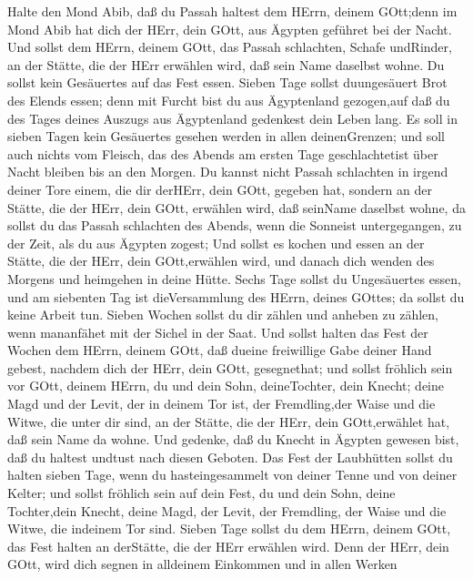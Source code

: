  Halte den Mond Abib, daß du Passah haltest dem HErrn,
deinem GOtt;denn im Mond Abib hat dich der HErr, dein GOtt, aus Ägypten
geführet bei der Nacht.  Und sollst dem HErrn, deinem GOtt,
das Passah schlachten, Schafe undRinder, an der Stätte, die der HErr
erwählen wird, daß sein Name daselbst wohne.  Du sollst kein
Gesäuertes auf das Fest essen. Sieben Tage sollst duungesäuert Brot des
Elends essen; denn mit Furcht bist du aus Ägyptenland gezogen,auf daß du
des Tages deines Auszugs aus Ägyptenland gedenkest dein Leben lang.
 Es soll in sieben Tagen kein Gesäuertes gesehen werden in
allen deinenGrenzen; und soll auch nichts vom Fleisch, das des Abends am
ersten Tage geschlachtetist über Nacht bleiben bis an den Morgen.
 Du kannst nicht Passah schlachten in irgend deiner Tore
einem, die dir derHErr, dein GOtt, gegeben hat,  sondern an
der Stätte, die der HErr, dein GOtt, erwählen wird, daß seinName
daselbst wohne, da sollst du das Passah schlachten des Abends, wenn die
Sonneist untergegangen, zu der Zeit, als du aus Ägypten zogest;
 Und sollst es kochen und essen an der Stätte, die der HErr,
dein GOtt,erwählen wird, und danach dich wenden des Morgens und
heimgehen in deine Hütte.  Sechs Tage sollst du Ungesäuertes
essen, und am siebenten Tag ist dieVersammlung des HErrn, deines GOttes;
da sollst du keine Arbeit tun.  Sieben Wochen sollst du dir
zählen und anheben zu zählen, wenn mananfähet mit der Sichel in der
Saat.  Und sollst halten das Fest der Wochen dem HErrn,
deinem GOtt, daß dueine freiwillige Gabe deiner Hand gebest, nachdem
dich der HErr, dein GOtt, gesegnethat;  und sollst fröhlich
sein vor GOtt, deinem HErrn, du und dein Sohn, deineTochter, dein
Knecht; deine Magd und der Levit, der in deinem Tor ist, der
Fremdling,der Waise und die Witwe, die unter dir sind, an der Stätte,
die der HErr, dein GOtt,erwählet hat, daß sein Name da wohne.
 Und gedenke, daß du Knecht in Ägypten gewesen bist, daß du
haltest undtust nach diesen Geboten.  Das Fest der
Laubhütten sollst du halten sieben Tage, wenn du hasteingesammelt von
deiner Tenne und von deiner Kelter;  und sollst fröhlich
sein auf dein Fest, du und dein Sohn, deine Tochter,dein Knecht, deine
Magd, der Levit, der Fremdling, der Waise und die Witwe, die indeinem
Tor sind.  Sieben Tage sollst du dem HErrn, deinem GOtt,
das Fest halten an derStätte, die der HErr erwählen wird. Denn der HErr,
dein GOtt, wird dich segnen in alldeinem Einkommen und in allen Werken
